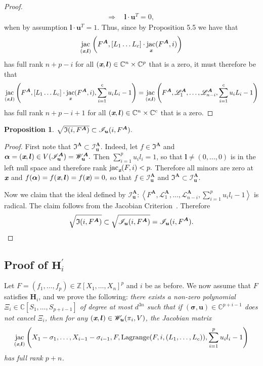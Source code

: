 \documentclass[a4paper]{article}
\def\sLA{\mathscr{L}^{\mA}}
\def\mA{{\bm A}}
\def\ub{{\bm u}}
\def\lb{{\bm l}}
\def\xb{\textit{\textbf{x}}}
\DeclareMathOperator{\jac}{jac}
\DeclareMathOperator{\lag}{Lagrange}
\newcommand{\ZZ}{{\mathbb{Z}}}
\def\C{\mathbb{C}}
\def\IA{\mathfrak{I}^{\mA}}
\def\lagF{{\bm\lag}(F,i,(L_1,\hdots,L_c))}
\def\IilA{\mathscr{I}_{\ub}(i,F^{\mA})}
\def\IlA{\mathscr{I}_{\ub}^{\mA}}
\def\Wil{\mathscr{W}_{\ub}(\pi_i,V)}
\def\WlA{\mathscr{W}_{\ub}^{\mA}}
\def\udl{\sum_{i=1}^pu_il_i}
\newtheorem{prop}[theorem]{Proposition}
\begin{document}
\begin{proof}
\begin{align*}
        \Rightarrow
        ~&~\lb \cdot \ub^T = 0,
    \end{align*}
    when by assumption $\lb \cdot \ub^T = 1.$ Thus, since by Proposition 5.5 we have that
    \[
   \jac_{(\xb,\lb)} \left(F^{\mA},[L_1 \hdots L_c] \cdot \jac_{\xb} (F^{\mA}, i)\right)
    \]
    has full rank $n+p-i$ for all $(\xb, \bm l) \in \C^n \times \C^p$ that is a zero, it must therefore be that 
    \[
    \jac_{(\xb,\lb)} \left(F^{\mA},[L_1 \hdots L_c] \cdot \jac_{\xb} (F^{\mA}, i),\sum_{i=1}^c u_iL_i-1\right)
    =
        \jac_{(\xb,\lb)} \left(F^{\mA},\sLA_1,\hdots,\sLA_{n-i},\sum_{i=1}^c u_iL_i-1\right)
    \]
    has full rank $n+p-i+1$ for all $(\xb, \bm l) \in \C^n \times \C^c$ that is a zero.
    \end{proof}
    \begin{prop}\label{prop:polV2}
    $
    \sqrt{\frak{I}(i,F^{\mA})} \subset \IilA.
    $
    \end{prop}
    \begin{proof}
    First note that $\IA \subset \IlA.$ Indeed, let $f \in \IA$ and $\bm \alpha = (\xb,\lb) \in V(\IlA)=\WlA.$ Then $\sum_{i=1}^p u_i l_i = 1$, so that $\lb \not = (0,\hdots,0)$ is in the left null space and therefore rank $\jac_{\xb} (F,i) < p.$ Therefore all minors are zero at $\xb$ and $f(\bm \alpha)= f(\xb,\lb)=f(\xb)=0,$ so that $f \in \IlA$ and $\IA \subset \IlA.$
    \par 
    Now we claim that the ideal defined by $\IlA:\left\langle F^{\mA},\sLA_1,\hdots,\sLA_{n-i},\udl-1 \right\rangle$ is radical. The claim follows from the Jacobian Criterion~\cite[Corollary 16.20]{ECA}. Therefore 
    \[
    \sqrt{\frak{I}(i,F^{\mA})} \subset \sqrt{\IilA} = \IilA.
    \]
    \end{proof}




\subsection{Proof of $\textbf{H}_i^{'}$}\label{ssec:fiber}
Let $F = (f_1,\hdots,f_p) \in \ZZ[X_1,\hdots,X_n]^p$ and $i$ be as before. We now assume
that $F$ satisfies $\textbf{H}_i$, and we prove the following: {\em
  there exists a non-zero polynomial $\Xi_{i} \in
  \C[S_1,\dots,S_{p+i-1}]$ of degree at most $d^{3n}$ such that if $
  (\bm \sigma,\ub) \in \C^{p+i-1}$ does not cancel
  $\Xi_{i}$, then for any $(\xb,\lb) \in \Wil$, the Jacobian matrix
  $$\jac_{(\xb,\lb)}\left(X_1-\sigma_1,\dots,X_{i-1}-\sigma_{i-1},F,\lagF,\udl-1\right)$$ has full rank $p+n$.}
\end{document}
